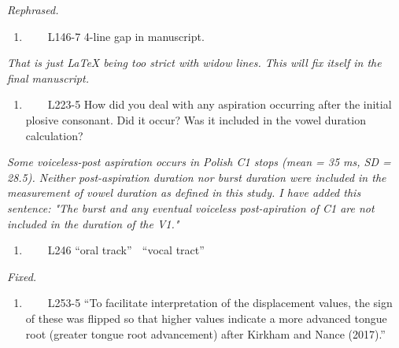 \documentclass[]{article}
\providecommand{\tightlist}{%
  \setlength{\itemsep}{0pt}\setlength{\parskip}{0pt}}
\begin{document}
\begin{adjustwidth}{1cm}{} \textit{
Rephrased.
} \end{adjustwidth}

\begin{enumerate}
\def\labelenumi{\arabic{enumi}.}
\setcounter{enumi}{4}
\tightlist
\item
  ~~~~L146-7 4-line gap in manuscript.
\end{enumerate}

\begin{adjustwidth}{1cm}{} \textit{
That is just LaTeX being too strict with widow lines. This will fix itself in the final manuscript.
} \end{adjustwidth}

\begin{enumerate}
\def\labelenumi{\arabic{enumi}.}
\setcounter{enumi}{5}
\tightlist
\item
  ~~~~L223-5 How did you deal with any aspiration occurring after the
  initial plosive consonant. Did it occur? Was it included in the vowel
  duration calculation?
\end{enumerate}

\begin{adjustwidth}{1cm}{} \textit{
Some voiceless-post aspiration occurs in Polish C1 stops (mean = 35 ms, SD = 28.5).
Neither post-aspiration duration nor burst duration were included in the measurement of vowel duration as defined in this study.
I have added this sentence: "The burst and any eventual voiceless post-apiration of C1 are not included in the duration of the V1."
} \end{adjustwidth}

\begin{enumerate}
\def\labelenumi{\arabic{enumi}.}
\setcounter{enumi}{6}
\tightlist
\item
  ~~~~L246 ``oral track''  ``vocal tract''
\end{enumerate}

\begin{adjustwidth}{1cm}{} \textit{
Fixed.
} \end{adjustwidth}

\begin{enumerate}
\def\labelenumi{\arabic{enumi}.}
\setcounter{enumi}{7}
\tightlist
\item
  ~~~~L253-5 ``To facilitate interpretation of the displacement values,
  the sign of these was flipped so that higher values indicate a more
  advanced tongue root (greater tongue root advancement) after Kirkham
  and Nance (2017).''
\end{enumerate}
\end{document}
